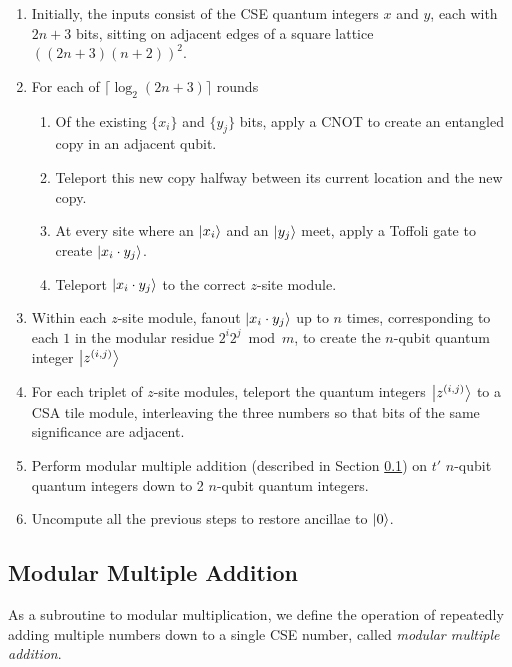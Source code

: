 \documentclass[twoside]{article}
\begin{document}
\begin{enumerate}
\item Initially, the inputs consist of the CSE quantum integers $x$ and $y$,
each with $2n+3$ bits, sitting on adjacent edges of a square lattice
$((2n+3)(n+2))^2$.
\item For each of $\lceil \log_2 (2n+3) \rceil$ rounds
\begin{enumerate}
\item Of the existing $\{x_i\}$ and $\{y_j\}$ bits, apply a CNOT to create an
entangled copy in an adjacent qubit.
\item Teleport this new copy halfway between its current location and the
new copy.
\item At every site where an $\left\vert{x_i}\right\rangle$ and an $\left\vert{y_j}\right\rangle$ meet,
apply a Toffoli gate to create $\left\vert{x_i \cdot y_j}\right\rangle$.
\item Teleport $\left\vert{x_i \cdot y_j}\right\rangle$ to the correct $z$-site module.
\end{enumerate}
\item Within each $z$-site module, fanout $\left\vert{x_i \cdot y_j}\right\rangle$ up to $n$
times, corresponding to each $1$ in the modular residue $2^i 2^j \bmod m$,
to create the $n$-qubit quantum integer $\left\vert{z^{(i,j)}}\right\rangle$
\item For each triplet of $z$-site modules, teleport the quantum integers
$\left\vert{z^{(i,j)}}\right\rangle$ to a CSA tile module, interleaving the three numbers so that
bits of the same significance are adjacent.
\item Perform modular multiple addition (described in Section \ref{subsec:mma})
on $t'$ $n$-qubit quantum integers down to 2 $n$-qubit quantum integers.
\item Uncompute all the previous steps to restore ancillae to $\left\vert{0}\right\rangle$.
\end{enumerate}

\subsection{Modular Multiple Addition}
\label{subsec:mma}

As a subroutine to modular multiplication, we define the operation of
repeatedly adding multiple numbers down to a single CSE number, called
\emph{modular multiple addition}.
\end{document}
